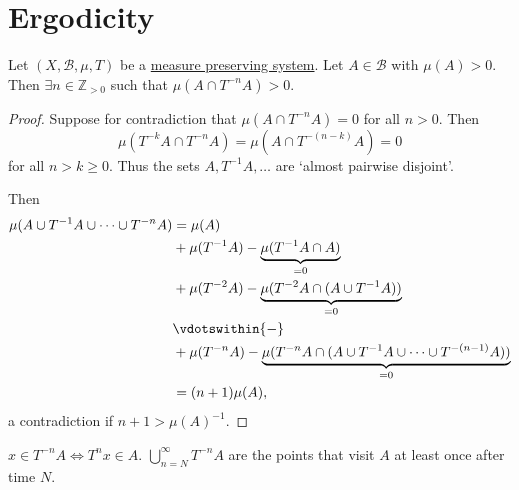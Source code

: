\documentclass{article}
\begin{document}
\clearpage
\section{Ergodicity}
\begin{lemma}
  Let $(X, \mathcal{B}, \mu, T)$ be a \hyperlink{def:mps}{measure preserving system}.
  Let $A \in \mathcal{B}$ with $\mu(A) > 0$. Then $\exists n \in \mathbb{Z}_{> 0}$ such that $\mu(A \cap T^{-n} A) > 0$.
\end{lemma}
\begin{proof}
  Suppose for contradiction that $\mu(A \cap T^{-n}A) = 0$ for all $n > 0$.
  Then
  \begin{equation*}\mu(T^{-k}A \cap T^{-n} A) = \mu(A \cap T^{-(n-k)}A) = 0\end{equation*}
  for all $n > k \geq 0$.
  Thus the sets $A, T^{-1} A, \dotsc$ are `almost pairwise disjoint'.

  Then
  \begin{align*}
    \mu(A \cup T^{-1} A \cup \dotsb \cup T^{-n} A) &= \mu(A) \\
                                                   &+ \mu(T^{-1} A) - \underbrace{\mu(T^{-1}A \cap A)}_{=0} \\
                                                   &+ \mu(T^{-2} A) - \underbrace{\mu(T^{-2} A \cap (A \cup T^{-1} A))}_{=0} \\
                                                   &\vdotswithin{-}\\
                                                   &+ \mu(T^{-n} A) - \underbrace{\mu(T^{-n} A \cap (A \cup T^{-1} A \cup \dotsb \cup T^{-(n-1)} A))}_{=0} \\
                                                   &= (n+1) \mu(A),
  \end{align*}
  a contradiction if $n + 1 > \mu(A)^{-1}$.
\end{proof}
\begin{remark}
  $x \in T^{-n} A \iff T^n x \in A$. $\bigcup_{n=N}^\infty T^{-n} A$ are the points that visit $A$ at least once after time $N$.
\end{remark}
\end{document}
